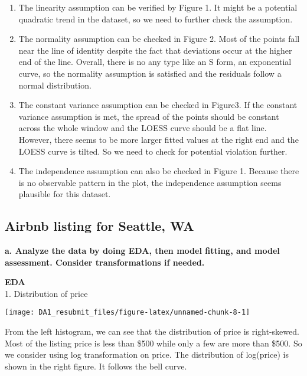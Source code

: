 \documentclass[
]{article}
\begin{document}
\begin{enumerate}
\def\labelenumi{\arabic{enumi}.}
\item
  The linearity assumption can be verified by Figure 1. It might be a
  potential quadratic trend in the dataset, so we need to further check
  the assumption.
\item
  The normality assumption can be checked in Figure 2. Most of the
  points fall near the line of identity despite the fact that deviations
  occur at the higher end of the line. Overall, there is no any type
  like an S form, an exponential curve, so the normality assumption is
  satisfied and the residuals follow a normal distribution.
\item
  The constant variance assumption can be checked in Figure3. If the
  constant variance assumption is met, the spread of the points should
  be constant across the whole window and the LOESS curve should be a
  flat line. However, there seems to be more larger fitted values at the
  right end and the LOESS curve is tilted. So we need to check for
  potential violation further.
\item
  The independence assumption can also be checked in Figure 1. Because
  there is no observable pattern in the plot, the independence
  assumption seems plausible for this dataset.
\end{enumerate}

\newpage

\hypertarget{airbnb-listing-for-seattle-wa}{%
\subsection{Airbnb listing for Seattle,
WA}\label{airbnb-listing-for-seattle-wa}}

\textbf{a. Analyze the data by doing EDA, then model fitting, and model
assessment. Consider transformations if needed.}

\textbf{EDA}\\
1. Distribution of price

\begin{center}\texttt{[image: DA1\_resubmit\_files/figure-latex/unnamed-chunk-8-1]} \end{center}

From the left histogram, we can see that the distribution of price is
right-skewed. Most of the listing price is less than \$500 while only a
few are more than \$500. So we consider using log transformation on
price. The distribution of log(price) is shown in the right figure. It
follows the bell curve.
\end{document}
